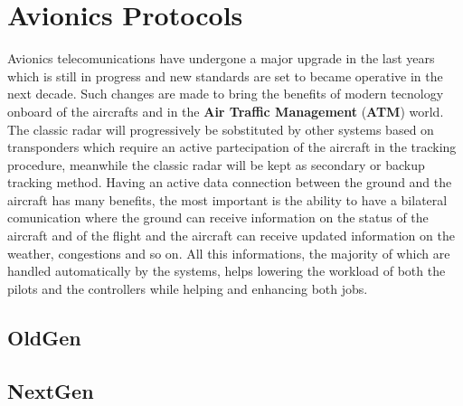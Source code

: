 \documentclass[../main.tex]{subfiles}
\begin{document}
\chapter{Avionics Protocols}
\label{chap:avionicsprot}
Avionics telecomunications have undergone a major upgrade in the last years which is still in progress and new standards are set to became operative in the next decade. Such changes are made to bring the benefits of modern tecnology onboard of the aircrafts and in the \textbf{Air Traffic Management} (\textbf{ATM}) world. The classic radar will progressively be sobstituted by other systems based on transponders which require an active partecipation of the aircraft in the tracking procedure, meanwhile the classic radar will be kept as secondary or backup tracking method. Having an active data connection between the ground and the aircraft has many benefits, the most important is the ability to have a bilateral comunication where the ground can receive information on the status of the aircraft and of the flight and the aircraft can receive updated information on the weather, congestions and so on. All this informations, the majority of which are handled automatically by the systems, helps lowering the workload of both the pilots and the controllers while helping and enhancing both jobs.

\section{OldGen}


\section{NextGen}

\end{document}
